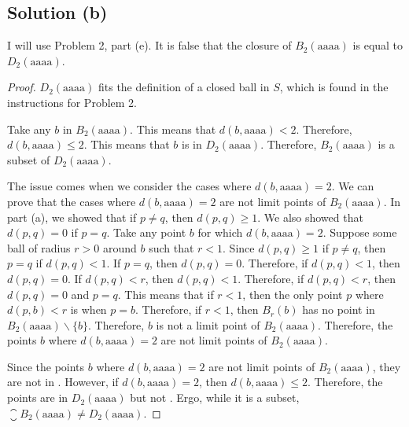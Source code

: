 \documentclass[11pt]{article}
\begin{document}
    \subsection{Solution (b)}
        I will use Problem 2, part (e).
        It is false that the closure of $B_2(\text{aaaa})$ is equal to $D_2(\text{aaaa})$.
        \begin{proof}
            $D_2(\text{aaaa})$ fits the definition of a closed ball in $S$, which is found in the instructions for Problem 2. 

            Take any $b$ in $B_2(\text{aaaa})$.
            This means that $d(b, \text{aaaa}) < 2$.
            Therefore, $d(b, \text{aaaa}) \leq 2$.
            This means that $b$ is in $D_2(\text{aaaa})$.
            Therefore, $B_2(\text{aaaa})$ is a subset of $D_2(\text{aaaa})$.

            The issue comes when we consider the cases where $d(b, \text{aaaa}) = 2$.
            We can prove that the cases where $d(b, \text{aaaa}) = 2$ are not limit points of $B_2(\text{aaaa})$.
            In part (a), we showed that if $p \neq q$, then $d(p,q) \geq 1$.
            We also showed that $d(p,q) = 0$ if $p = q$.
            Take any point $b$ for which $d(b, \text{aaaa}) = 2$.
            Suppose some ball of radius $r > 0$ around $b$ such that $r < 1$.
            Since $d(p,q) \geq 1$ if $p \neq q$, then $p = q$ if $d(p,q) < 1$.
            If $p = q$, then $d(p,q) = 0$.
            Therefore, if $d(p,q) < 1$, then $d(p,q) = 0$.
            If $d(p,q) < r$, then $d(p,q) < 1$.
            Therefore, if $d(p,q) < r$, then $d(p,q) = 0$ and $p = q$.
            This means that if $r < 1$, then the only point $p$ where $d(p,b) < r$ is when $p = b$.
            Therefore, if $r < 1$, then $B_r(b)$ has no point in $B_2(\text{aaaa}) \backslash \{b\}$.
            Therefore, $b$ is not a limit point of $B_2(\text{aaaa})$.
            Therefore, the points $b$ where $d(b, \text{aaaa}) = 2$ are not limit points of $B_2(\text{aaaa})$.

            Since the points $b$ where $d(b, \text{aaaa}) = 2$ are not limit points of $B_2(\text{aaaa})$, they are not in .
            However, if $d(b, \text{aaaa}) = 2$, then $d(b, \text{aaaa}) \leq 2$.
            Therefore, the points are in $D_2(\text{aaaa})$ but not .
            Ergo, while it is a subset, $\closure{B_2(\text{aaaa})} \neq D_2(\text{aaaa})$.
        \end{proof}
    \pagebreak
\end{document}
